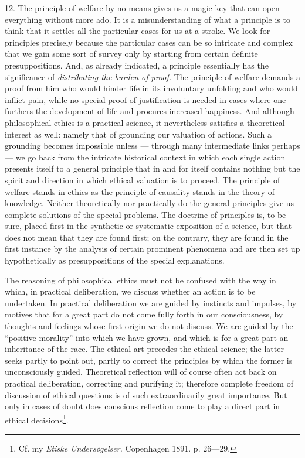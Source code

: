 \documentclass[12pt,a4paper,openany]{book}
\newcommand{\opage}[1]{\marginnote{\footnotesize\textit{[#1]}}}
\begin{document}
12. The principle of welfare by no means gives us a magic key that can open everything without more
ado. It is a misunderstanding of what a principle is to think that it settles all the particular
cases for us at a stroke. We look for principles precisely because the particular cases can be so
intricate and
\opage{46}complex that we gain some sort of survey only by starting from certain definite presuppositions.
And, as already indicated, a principle essentially has the significance of \textit{distributing the
burden of proof.} The principle of welfare demands a proof from him who would hinder life in its
involuntary unfolding and who would inflict pain, while no special proof of justification is needed
in cases where one furthers the development of life and procures increased happiness. And although
philosophical ethics is a practical science, it nevertheless satisfies a theoretical interest as
well: namely that of grounding our valuation of actions. Such a grounding becomes impossible unless
--- through many intermediate links perhaps --- we go back from the intricate historical context in
which each single action presents itself to a general principle that in and for itself contains
nothing but the spirit and direction in which ethical valuation is to proceed. The principle of
welfare stands in ethics as the principle of causality stands in the theory of knowledge. Neither
theoretically nor practically do the general principles give us complete solutions of the special
problems. The doctrine of principles is, to be sure, placed first in the synthetic or systematic
exposition of a science, but that does not mean that they are found first; on the contrary, they are
found in the first instance by the analysis of certain prominent phenomena and are then set up
hypothetically as presuppositions of the special explanations.

The reasoning of philosophical ethics must not be confused with the way in which, in practical
deliberation, we discuss whether an action is to be undertaken. In practical deliberation we are
guided by instincts and impulses, by motives that for a great part do not come fully forth in our
consciousness, by thoughts and feelings whose first origin we do not discuss. We are guided by the
``positive morality'' into which we have grown, and which is for a great part an inheritance of the
race. The ethical art precedes the ethical science; the latter seeks partly to point out, partly to
correct the principles by which the former is unconsciously guided. Theoretical reflection will of
course often act back on practical deliberation, correcting and purifying it; therefore complete
freedom of discussion of ethical questions
\opage{47}is of such extraordinarily great importance. But only in cases of doubt does conscious reflection
come to play a direct part in ethical decisions\footnote[1]{Cf. my \textit{Etiske Undersøgelser.}
Copenhagen 1891. p. 26---29.}.
\end{document}
